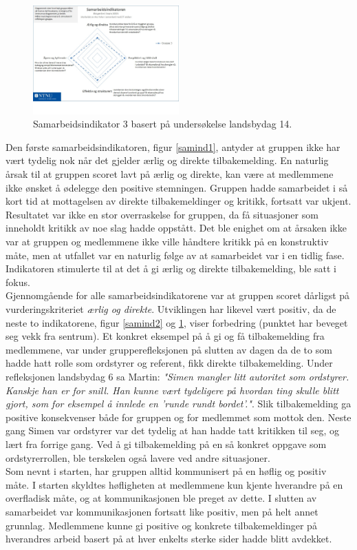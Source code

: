 \begin{figure}[h!]
  \centering
    \includegraphics[width=0.5\textwidth]{Bilder/samarbeidsindikator_3.jpg}
    \caption{Samarbeidsindikator 3 basert på undersøkelse landsbydag 14.}
    \label{samind3}
\end{figure}

Den første samarbeidsindikatoren, figur \ref{samind1}, antyder at gruppen ikke har vært tydelig nok når det gjelder ærlig og direkte tilbakemelding.
En naturlig årsak til at gruppen scoret lavt på ærlig og direkte, kan være at medlemmene ikke ønsket å ødelegge den positive stemningen. Gruppen hadde samarbeidet i så kort tid at mottagelsen av direkte tilbakemeldinger og kritikk, fortsatt var ukjent. Resultatet var ikke en stor overraskelse for gruppen, da få situasjoner som inneholdt kritikk av noe slag hadde oppstått. Det ble enighet om at årsaken ikke var at gruppen og medlemmene ikke ville håndtere kritikk på en konstruktiv måte, men at utfallet var en naturlig følge av at samarbeidet var i en tidlig fase. Indikatoren stimulerte til at det å gi ærlig og direkte tilbakemelding, ble satt i fokus. \\

Gjennomgående for alle samarbeidsindikatorene var at gruppen scoret dårligst på vurderingskriteriet \textit{ærlig og direkte}. 
Utviklingen har likevel vært positiv, da de neste to indikatorene, figur \ref{samind2} og \ref{samind3}, viser forbedring (punktet har beveget seg vekk fra sentrum). 
Et konkret eksempel på å gi og få tilbakemelding fra medlemmene, var under grupperefleksjonen på slutten av dagen da de to som hadde hatt rolle som ordstyrer og referent, fikk direkte tilbakemelding. Under refleksjonen landsbydag 6 sa Martin: \textit{"Simen mangler litt autoritet som ordstyrer. Kanskje han er for snill. Han kunne vært tydeligere på hvordan ting skulle blitt gjort, som for eksempel å innlede en 'runde rundt bordet'."}. Slik tilbakemelding ga positive konsekvenser både for gruppen og for medlemmet som mottok den. Neste gang Simen var ordstyrer var det tydelig at han hadde tatt kritikken til seg, og lært fra forrige gang.
Ved å gi tilbakemelding på en så konkret oppgave som ordstyrerrollen, ble terskelen også lavere ved andre situasjoner. \\

Som nevnt i starten, har gruppen alltid kommunisert på en høflig og positiv måte. I starten skyldtes høfligheten at medlemmene kun kjente hverandre på en overfladisk måte, og at kommunikasjonen ble preget av dette. I slutten av samarbeidet var kommunikasjonen fortsatt like positiv, men på helt annet grunnlag. Medlemmene kunne gi positive og konkrete tilbakemeldinger på hverandres arbeid basert på at hver enkelts sterke sider hadde blitt avdekket.